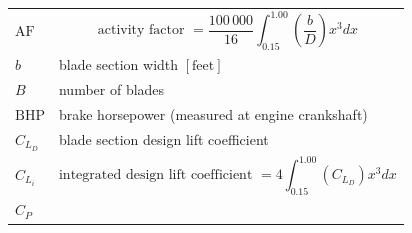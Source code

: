 \documentclass[
]{book}
\begin{document}
\begin{longtable}[]{@{}ll@{}}
\toprule
\endhead
\begin{minipage}[t]{0.14\columnwidth}\raggedright
\(\mathrm{AF}\)\strut
\end{minipage} & \begin{minipage}[t]{0.80\columnwidth}\raggedright
\[ \text{activity factor } = \frac{100\,000}{16} \int_{0.15}^{1.00} \left( \frac{b}{D} \right) x^3 dx \]\strut
\end{minipage}\tabularnewline
\begin{minipage}[t]{0.14\columnwidth}\raggedright
\(b\)\strut
\end{minipage} & \begin{minipage}[t]{0.80\columnwidth}\raggedright
blade section width \(\left[ \text{feet} \right]\)\strut
\end{minipage}\tabularnewline
\begin{minipage}[t]{0.14\columnwidth}\raggedright
\(B\)\strut
\end{minipage} & \begin{minipage}[t]{0.80\columnwidth}\raggedright
number of blades\strut
\end{minipage}\tabularnewline
\begin{minipage}[t]{0.14\columnwidth}\raggedright
\(\mathrm{BHP}\)\strut
\end{minipage} & \begin{minipage}[t]{0.80\columnwidth}\raggedright
brake horsepower (measured at engine crankshaft)\strut
\end{minipage}\tabularnewline
\begin{minipage}[t]{0.14\columnwidth}\raggedright
\(C_{L_D}\)\strut
\end{minipage} & \begin{minipage}[t]{0.80\columnwidth}\raggedright
blade section design lift coefficient\strut
\end{minipage}\tabularnewline
\begin{minipage}[t]{0.14\columnwidth}\raggedright
\(C_{L_i}\)\strut
\end{minipage} & \begin{minipage}[t]{0.80\columnwidth}\raggedright
\[ \text{integrated design lift coefficient } = 4 \int_{0.15}^{1.00} \left( C_{L_D} \right) x^3 dx \]\strut
\end{minipage}\tabularnewline
\begin{minipage}[t]{0.14\columnwidth}\raggedright
\(C_P\)\strut
\end{minipage} & \begin{minipage}[t]{0.80\columnwidth}\raggedright

\end{minipage}
\end{longtable}
\end{document}
